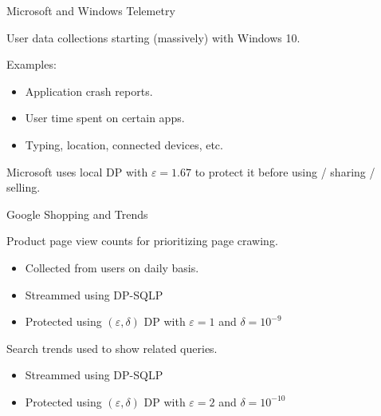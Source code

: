 \documentclass[12pt,aspectratio=169,handout]{beamer}
\begin{document}

\begin{frame}{Microsoft and Windows Telemetry}

User data collections starting (massively) with Windows 10. \vskip1mm

Examples: \vskip1mm 

\begin{itemize} \setlength\itemsep{2mm}
%
\item Application crash reports. 
%
\item User time spent on certain apps.
%
\item Typing, location, connected devices, etc. 
%
\end{itemize}

Microsoft uses local DP with $\varepsilon = 1.67$ to protect it before using / sharing / selling.


\end{frame}


\begin{frame}{Google Shopping and Trends}

Product page view counts for prioritizing page crawing. 

\begin{itemize} \setlength\itemsep{2mm}
%
\item Collected from users on daily basis. 
%
\item Streammed using DP-SQLP
%
\item Protected using $(\varepsilon, \delta)$ DP with $\varepsilon = 1$ and $\delta = 10^{-9}$
%
\end{itemize}

Search trends used to show related queries. 
 
\begin{itemize} \setlength\itemsep{2mm}
%
\item Streammed using DP-SQLP
%
\item Protected using $(\varepsilon, \delta)$ DP with $\varepsilon = 2$ and $\delta = 10^{-10}$
%
\end{itemize}

\end{frame}
\end{document}

